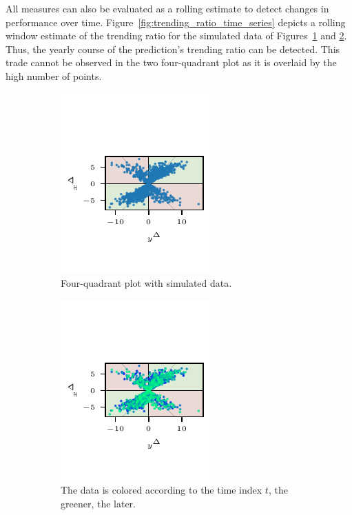 All measures can also be evaluated as a rolling estimate to detect changes in performance over time.
Figure~\ref{fig:trending_ratio_time_series} depicts a rolling window estimate of the trending ratio for the simulated data of Figures~\ref{fig:trending_basic_4q_sample} and \ref{fig:trending_basic_4q_sample_color}.
Thus, the yearly course of the prediction's trending ratio can be detected.
This trade cannot be observed in the two four-quadrant plot as it is overlaid by the high number of points.

\begin{figure}
    \centering
    \begin{subfigure}[t]{.24\textwidth}
\includegraphics{plots/illustrative_examples/4Q_sample_without_time}
\caption{Four-quadrant plot with simulated data.}\label{fig:trending_basic_4q_sample}
\end{subfigure}%
\begin{subfigure}[t]{.24\textwidth}
\includegraphics{plots/illustrative_examples/4Q_sample_with_time}
\caption{The data is colored according to the time index $t$, the greener, the later.}\label{fig:trending_basic_4q_sample_color}
\end{subfigure}%
\begin{subfigure}[t]{.48\textwidth}

\end{subfigure}
\end{figure}
